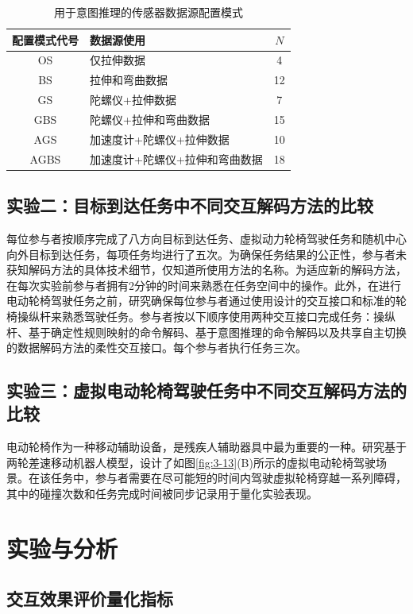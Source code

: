 \begin{table}
    \centering
    \caption{用于意图推理的传感器数据源配置模式}
    \setlength{\tabcolsep}{3pt}
    \begin{tabular}{c p{180pt} c }
    \hline\hline
    配置模式代号 & 数据源使用 & $N$ \\ 
    \hline
    OS& 仅拉伸数据& 4 \\ 
    BS& 拉伸和弯曲数据&12 \\ 
    GS& 陀螺仪+拉伸数据&7 \\ 
    GBS& 陀螺仪+拉伸和弯曲数据&15 \\ 
    AGS& 加速度计+陀螺仪+拉伸数据&10 \\ 
    AGBS& 加速度计+陀螺仪+拉伸和弯曲数据&18 \\ 
    \hline\hline
    \end{tabular}
    \label{tab3-1}
\end{table}     

\subsection{实验二：目标到达任务中不同交互解码方法的比较} 每位参与者按顺序完成了八方向目标到达任务、虚拟动力轮椅驾驶任务和随机中心向外目标到达任务，每项任务均进行了五次。为确保任务结果的公正性，参与者未获知解码方法的具体技术细节，仅知道所使用方法的名称。为适应新的解码方法，在每次实验前参与者拥有2分钟的时间来熟悉在任务空间中的操作。此外，在进行电动轮椅驾驶任务之前，研究确保每位参与者通过使用设计的交互接口和标准的轮椅操纵杆来熟悉驾驶任务。参与者按以下顺序使用两种交互接口完成任务：操纵杆、基于确定性规则映射的命令解码、基于意图推理的命令解码以及共享自主切换的数据解码方法的柔性交互接口。每个参与者执行任务三次。 

\subsection{实验三：虚拟电动轮椅驾驶任务中不同交互解码方法的比较}电动轮椅作为一种移动辅助设备，是残疾人辅助器具中最为重要的一种。研究基于两轮差速移动机器人模型，设计了如图\ref{fig:3-13}(B)所示的虚拟电动轮椅驾驶场景。在该任务中，参与者需要在尽可能短的时间内驾驶虚拟轮椅穿越一系列障碍，其中的碰撞次数和任务完成时间被同步记录用于量化实验表现。

\section{实验与分析}

\subsection{交互效果评价量化指标}   
